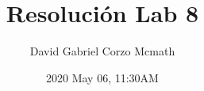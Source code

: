 \documentclass{article}
\title{Resolución Lab 8}
\date{2020 May 06, 11:30AM}
\author{David Gabriel Corzo Mcmath}
\begin{document}
\maketitle

\section{}
















\end{document}
